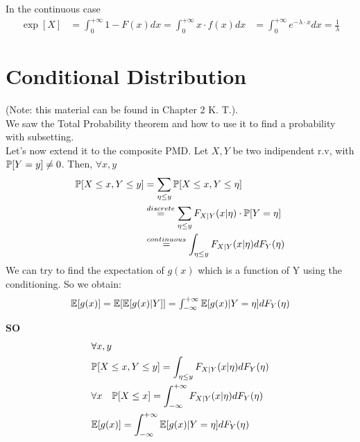 In the continuous case
\begin{equation}
  \begin{split}
    \exp[X] &= \int_{0}^{+\infty} 1-F(x) dx = \int_{0}^{+\infty} x \cdot f(x) dx
    &=\int_{0}^{+\infty} e^{-\lambda \cdot x} dx = \frac{1}{\lambda}
  \end{split}
\end{equation}

\section{Conditional Distribution}
(Note: this material can be found in Chapter 2 K. T.).\\
We saw the Total Probability theorem and how to use it to find a probability with subsetting.\\
Let's now extend it to the composite PMD. Let $X,Y$ be two indipendent r.v, with $\mathbb{P}[Y=y]\neq 0$.
Then, $\forall x,y$
\begin{equation}
  \begin{split}
    \mathbb{P}[X\le x, Y \le y] &= \sum \limits_{\eta \le y} \mathbb{P}[X \le x , Y \le \eta] \\
    &\stackrel{discrete}{=} \sum \limits_{\eta \le y} F_{X|Y}(x | \eta) \cdot \mathbb{P}[Y=\eta]\\
    &\stackrel{continuous}{=} \int_{\eta \le y} F_{X|Y}(x|\eta) dF_Y(\eta)
  \end{split}
\end{equation}
We can try to find the expectation of $g(x)$ which is a function of Y using the conditioning. So we obtain:
\begin{equation}
  $$\exp[g(x)]=\exp[\exp[g(x)|Y]] = \int_{-\infty}^{+\infty}\exp[g(x)|Y=\eta] dF_Y(\eta)$$
\end{equation}

\textbf{SO}
\begin{equation}
  \begin{split}
   &\forall x,y \\
  &\mathbb{P}[X\le x , Y \le y] = \int_{\eta \le y} F_{X|Y}(x|\eta) dF_Y(\eta)\\
  &\forall x \quad \mathbb{P}[X \le x] = \int_{-\infty}^{+\infty}F_{X|Y}(x|\eta) dF_Y(\eta) \\
  &\mathbb{E}[g(x)]=\int_{-\infty}^{+\infty}
  \mathbb{E}[g(x)|Y=\eta] dF_Y(\eta)
  \end{split}
\end{equation}


